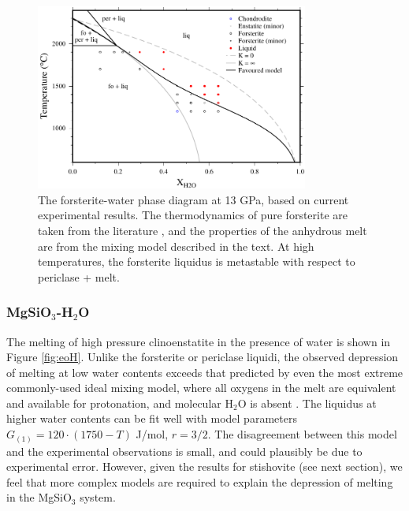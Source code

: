 \documentclass[review]{elsarticle}
\begin{document}
\begin{figure}[ht!]
  \centering
      \includegraphics[width=0.8\textwidth]{figures/forsterite}
      \caption{The forsterite-water phase diagram at 13 GPa, based on current experimental results. The thermodynamics of pure forsterite are taken from the literature \citep{SLB2011}, and the properties of the anhydrous melt are from the mixing model described in the text. At high temperatures, the forsterite liquidus is metastable with respect to periclase + melt.}
  \label{fig:foH}
\end{figure}
\clearpage


\subsubsection{MgSiO$_3$-H$_2$O}
The melting of high pressure clinoenstatite in the presence of water is shown in Figure \ref{fig:eoH}. Unlike the forsterite or periclase liquidi, the observed depression of melting at low water contents exceeds that predicted by even the most extreme commonly-used ideal mixing model, where all oxygens in the melt are equivalent and available for protonation, and molecular H$_2$O is absent \citep{SS1985}. The liquidus at higher water contents can be fit well with model parameters $G_{(1)} = 120 \cdot (1750-T)$ J/mol, $r=3/2$. The disagreement between this model and the experimental observations is small, and could plausibly be due to experimental error. However, given the results for stishovite (see next section), we feel that more complex models are required to explain the depression of melting in the MgSiO$_3$ system. 
\end{document}
